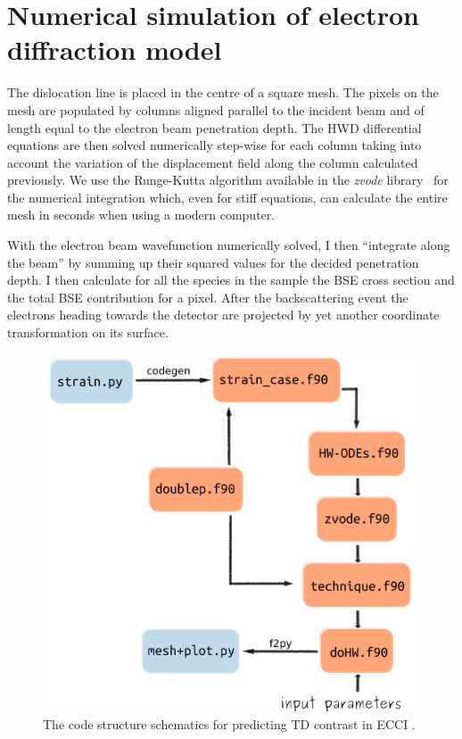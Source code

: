 \section{ Numerical simulation of electron diffraction model}
\label{sec:numerical}
The dislocation line is placed in the centre of a square mesh. The pixels on the mesh are populated by columns aligned parallel to the incident beam and of length equal to the electron beam penetration depth. The HWD differential equations are then solved numerically step-wise for each column taking into account the variation of the displacement field along the column calculated previously. We use the Runge-Kutta algorithm available in the \textit{zvode} library~\cite{Hindmarsh85} for the numerical integration which, even for stiff equations, can calculate the entire mesh in seconds when using a modern computer.

With the electron beam wavefunction numerically solved, I then ``integrate along the beam'' by summing up their squared values for the decided penetration depth. I then calculate for all the species in the sample the BSE cross section and the total BSE contribution for a pixel. After the backscattering event the electrons heading towards the detector are projected by yet another coordinate transformation on its surface.

\begin{figure}[ht]
    \centering
    \includegraphics[width=0.6\linewidth]{Figures/code.png}
    \caption{ The code structure  schematics for predicting TD contrast in ECCI . }
    \label{fig:code}
\end{figure}

